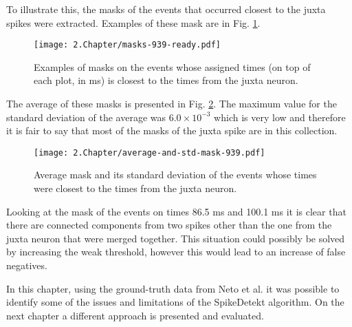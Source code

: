 To illustrate this, the masks of the events that occurred closest to the juxta spikes were extracted. Examples of these mask are in Fig. \ref{fig:masks-examples}.
 
\begin{figure}[!h]
	\centering
	\texttt{[image: 2.Chapter/masks-939-ready.pdf]}
	\caption{Examples of masks on the events whose assigned times (on top of each plot, in ms) is closest to the times from the juxta neuron.
}
\label{fig:masks-examples}
\end{figure}

The average of these masks is presented in Fig. \ref{fig:masks-average-std}. The maximum value for the standard deviation of the average was $6.0 \times 10^{-3}$ which is very low and therefore it is fair to say that most of the masks of the juxta spike are in this collection.

\begin{figure}[!h]
	\centering
	\texttt{[image: 2.Chapter/average-and-std-mask-939.pdf]}
	\caption{Average mask and its standard deviation of the events whose times were closest to the times from the juxta neuron.
}
\label{fig:masks-average-std}
\end{figure}


Looking at the mask of the events on times 86.5 ms  and 100.1 ms it is clear that there are connected components from two spikes other than the one from the juxta neuron that were merged together. This situation could possibly be solved by increasing the weak threshold, however this would lead to an increase of false negatives. 

In this chapter, using the ground-truth data from Neto et al. it was possible to identify some of the issues and limitations of the SpikeDetekt algorithm. On the next chapter a different approach is presented and evaluated.
